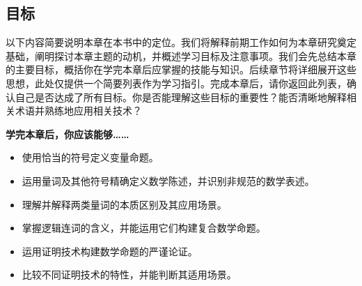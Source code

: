 \subsection{目标}

以下内容简要说明本章在本书中的定位。我们将解释前期工作如何为本章研究奠定基础，阐明探讨本章主题的动机，并概述学习目标及注意事项。我们会先总结本章的主要目标，概括你在学完本章后应掌握的技能与知识。后续章节将详细展开这些思想，此处仅提供一个简要列表作为学习指引。完成本章后，请你返回此列表，确认自己是否达成了所有目标。你是否能理解这些目标的重要性？能否清晰地解释相关术语并熟练地应用相关技术？

\textbf{学完本章后，你应该能够……}

\begin{itemize}
    \item 使用恰当的符号定义变量命题。
    \item 运用量词及其他符号精确定义数学陈述，并识别非规范的数学表述。
    \item 理解并解释两类量词的本质区别及其应用场景。
    \item 掌握逻辑连词的含义，并能运用它们构建复合数学命题。
    \item 运用证明技术构建数学命题的严谨论证。
    \item 比较不同证明技术的特性，并能判断其适用场景。
\end{itemize}
